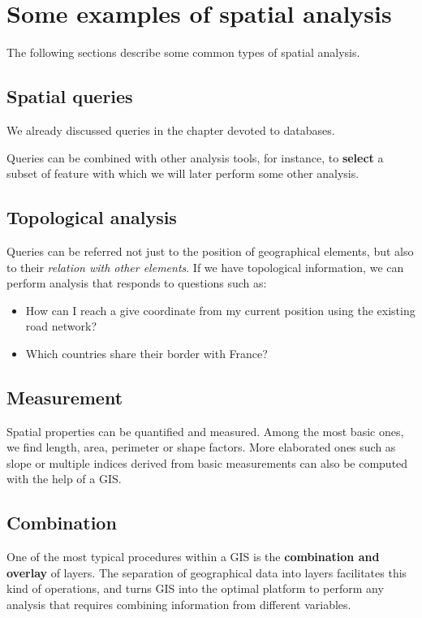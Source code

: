 \section{Some examples of spatial analysis}

The following sections describe some common types of spatial analysis.

\subsection{Spatial queries}

We already discussed queries in the chapter devoted to databases.

Queries can be combined with other analysis tools, for instance, to \textbf{select} a subset of feature with which we will later perform some other analysis.

\subsection{Topological analysis}

Queries can be referred not just to the position of geographical elements, but also to their \emph{relation with other elements}. If we have topological information, we can perform analysis that responds to questions such as:

\begin{itemize}
\item How can I reach a give coordinate from my current position using the existing road network? 

\item Which countries share their border with France?
\end{itemize}

\subsection{Measurement} 

Spatial properties can be quantified and measured. Among the most basic ones, we find length, area, perimeter or shape factors. More elaborated ones such as slope or multiple indices derived from basic measurements can also be computed with the help of a GIS.


\subsection{Combination}

One of the most typical procedures within a GIS is the \textbf{combination and overlay} of layers. The separation of geographical data into layers facilitates this kind of operations, and turns GIS into the optimal platform to perform any analysis that requires combining information from different variables.

